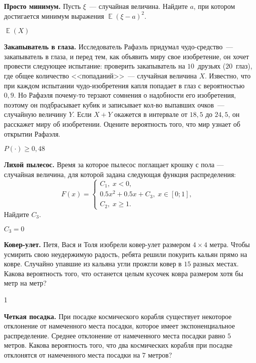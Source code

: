 \documentclass[12pt, addpoints]{exam} %
\DeclareMathOperator{\E}{\mathbb{E}}
\renewcommand{\ge}{\geqslant}
\renewcommand{\geq}{\geqslant}
\begin{document}
\begin{questions}

\question \textbf{Просто минимум.}
Пусть $\xi$~--- случайная величина.  Найдите $a$, при котором достигается минимум выражения $\E (\xi - a)^2$.

\begin{solution}
 $\E (X) $
\end{solution}



\question  \textbf{Закапыватель в глаза.} Исследователь Рафаэль придумал чудо-средство~--- закапыватель в глаза, и перед тем, как объявить миру свое изобретение, он хочет провести следующее испытание: проверить закапыватель на $10$~друзьях ($20$~глаз), где общее количество <<попаданий>>~--- случайная величина $X$. Известно, что при каждом испытании чудо-изобретения капля попадает в глаз с вероятностью $0,9$. Но Рафаэля почему-то терзают сомнения о надобности его изобретения, поэтому он подбрасывает кубик и записывает кол-во выпавших очков~--- случайную величину $Y$. Если $X+Y$ окажется в интервале от $18,5$ до $24,5$, он расскажет миру об изобретении. Оцените вероятность того, что мир узнает об открытии Рафаэля.

\begin{solution}
$P(\cdot) \ge 0,48$
\end{solution}

\question \textbf{Лихой пылесос. } Время за которое пылесос поглащает крошку с пола --- случайная величина, для которой задана следующая функция распределения:
		\[
		F(x)=\begin{cases}
		C_1, \; x< 0, \\
		0.5 x^2+ 0.5x+ C_3, \; x \in [0;1], \\
		C_2, \; x \geq 1.
		\end{cases}
		\]
		Найдите  $C_3$.
\begin{solution}
$C_3=0$
\end{solution}


\question \textbf{Ковер-улет. } Петя, Вася и Толя изобрели ковер-улет размером $4\times 4$ метра. Чтобы усмирить свою неудержимую радость, ребята решили покурить кальян прямо на ковре. Случайно упавшие из кальяна угли прожгли ковер в $15$ разных местах. Какова вероятность того, что останется целым кусочек ковра размером хотя бы метр на метр?
\begin{solution}
1
\end{solution}

\question \textbf{Четкая посадка.} При посадке космического корабля существует некоторое отклонение от намеченного места посадки, которое имеет экспоненциальное распределение. Среднее отклонение от намеченного места посадки равно $5$ метров. Какова вероятность того, что два космических корабля при посадке отклонятся от намеченного места посадки на $7$ метров?


\end{questions}
\end{document}
